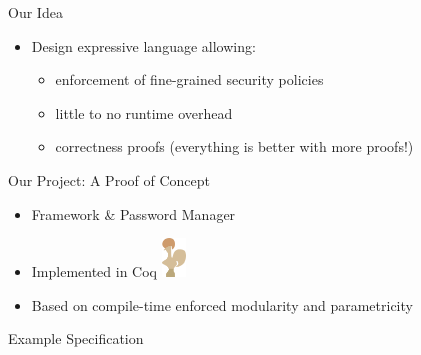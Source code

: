 \documentclass{beamer}
\newcommand{\fullwidth}[1]{\noindent\checkoddpage\makebox[0pt][r]{\makebox[\dimexpr1in+\hoffset+\ifoddpage\oddsidemargin\else\evensidemargin\fi][l]{#1}}}
\newcommand{\truecenter}[1]{\fullwidth{\parbox[c]{\paperwidth}{#1}}}
\def\untrusted#1{\save[].[#1]*[F]\frm{}\restore}
\def\trusted#1{\save[].[#1]*[F=]\frm{}\restore}
\begin{document}
\begin{frame}{\Huge Our Idea}
\Large
\begin{itemize}
  \item Design expressive language allowing:
  \begin{itemize}\Large
    \item enforcement of fine-grained security policies
    \item little to no runtime overhead \pause
    \item correctness proofs \small (everything is better with more proofs!)
  \end{itemize}
\end{itemize}
\end{frame}



\begin{frame}{\Huge Our Project: A Proof of Concept}
\Large
\begin{itemize}
  \item Framework \& Password Manager
  \item Implemented in Coq \includegraphics[width=0.05\textwidth]{coq-logo}
  \item Based on compile-time enforced modularity and parametricity
\end{itemize}
\end{frame}



\begin{frame}{\Huge Example Specification}
\Large
\vspace{-0.2in}
\truecenter{%
\[
\xymatrix@-0.5pc{
&\untrusted{ddddddrrrr} \\
&&\untrusted{dddd}\txt{\phantom{UI}}& \txt{\phantom{Encrypt}} & \untrusted{dddd}\txt{\phantom{Net}}&& \\
&&\txt{\phantom{UI}}\ar[r]& \trusted{}\txt{\textbf{Encrypt}}\ar[r]     &                 \txt{\phantom{Net}}\ar@{=>}[rrr]^>{\txt{Network Out}}&&& \\
\ar@{=>}[rr]^<{\txt{User In\ \ \phantom{.}}}&&\txt{UI}&  \ar[u]\ar[d]\trusted{}\txt{\textbf{Secret Key}}     &                 \txt{Net}& \\
&&\txt{\phantom{UI}}&  \ar[l]\untrusted{}\txt{Decrypt}     & \ar[l] \txt{\phantom{Net}}&&&\ar@{=>}[lll]^<{\txt{Network In}} \\
&&\txt{\phantom{UI}}& \txt{\phantom{Encrypt}} & \txt{\phantom{Net}}&& \\
&&\txt{\phantom{UI}}& \txt{\phantom{Encrypt}} & \txt{\phantom{Net}}&& \\
}
\]
}
\end{frame}
\end{document}
